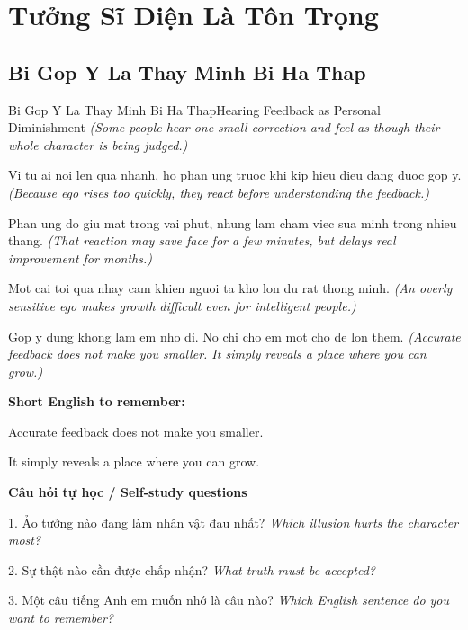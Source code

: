 \chapter{Tưởng Sĩ Diện Là Tôn Trọng}

\section{Bi Gop Y La Thay Minh Bi Ha Thap}
\begin{truyen}{Bi Gop Y La Thay Minh Bi Ha Thap}{Hearing Feedback as Personal Diminishment}
\textit{(Some people hear one small correction and feel as though their whole character is being judged.)}

Vi tu ai noi len qua nhanh, ho phan ung truoc khi kip hieu dieu dang duoc gop y.
\textit{(Because ego rises too quickly, they react before understanding the feedback.)}

Phan ung do giu mat trong vai phut, nhung lam cham viec sua minh trong nhieu thang.
\textit{(That reaction may save face for a few minutes, but delays real improvement for months.)}

Mot cai toi qua nhay cam khien nguoi ta kho lon du rat thong minh.
\textit{(An overly sensitive ego makes growth difficult even for intelligent people.)}

\end{truyen}

\begin{baihoc}
Gop y dung khong lam em nho di. No chi cho em mot cho de lon them.
\textit{(Accurate feedback does not make you smaller. It simply reveals a place where you can grow.)}
\end{baihoc}

\begin{ghinhoanh}
\textbf{Short English to remember:}

Accurate feedback does not make you smaller.

It simply reveals a place where you can grow.

\end{ghinhoanh}

\begin{tuhocnhanh}
\textbf{Câu hỏi tự học / Self-study questions}

1. Ảo tưởng nào đang làm nhân vật đau nhất? \textit{Which illusion hurts the character most?}

2. Sự thật nào cần được chấp nhận? \textit{What truth must be accepted?}

3. Một câu tiếng Anh em muốn nhớ là câu nào? \textit{Which English sentence do you want to remember?}
\end{tuhocnhanh}
\ngancach

